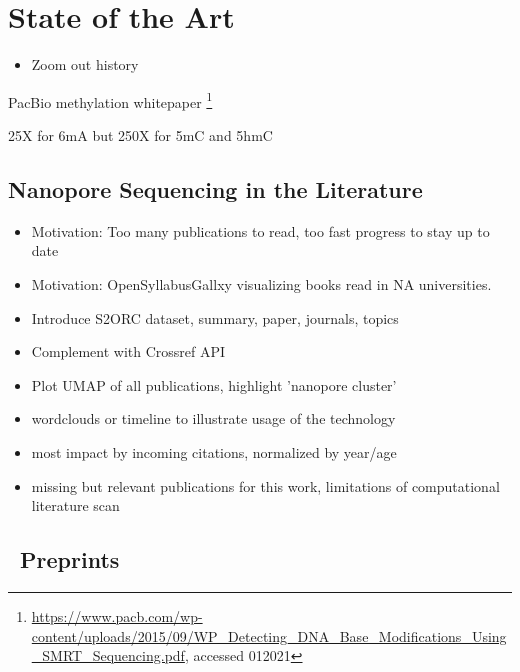 \chapter{State of the Art}
\label{cha:state_of_art}

\begin{itemize}
    \item Zoom out history \cite{Deamer2016}
\end{itemize}




PacBio methylation whitepaper \footnote{\url{https://www.pacb.com/wp-content/uploads/2015/09/WP_Detecting_DNA_Base_Modifications_Using_SMRT_Sequencing.pdf}, accessed 012021}

25X for 6mA but 250X for 5mC and 5hmC



\section{Nanopore Sequencing in the Literature}
\label{sec:state_of_art:nanopore_literature}

\begin{itemize}
    \item Motivation: Too many publications to read, too fast progress to stay up to date
    \item Motivation: OpenSyllabusGallxy visualizing books read in NA universities.
    \item Introduce S2ORC dataset, summary, paper, journals, topics
    \item Complement with Crossref API
    \item Plot UMAP of all publications, highlight 'nanopore cluster'
    \item wordclouds or timeline to illustrate usage of the technology
    \item most impact by incoming citations, normalized by year/age
    \item missing but relevant publications for this work, limitations of computational literature scan
\end{itemize}




\section{\Biorxiv\ Preprints}
\label{sec:state_of_art:biorxiv}

